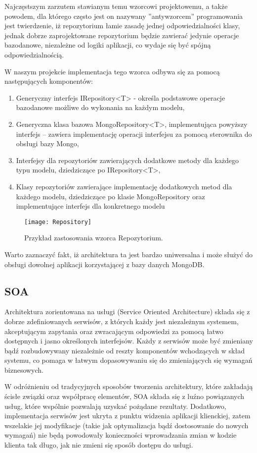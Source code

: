 Najczęstszym zarzutem stawianym temu wzorcowi projektowemu, a także powodem, dla którego często jest on nazywany ”antywzorcem” programowania jest twierdzenie, iż repozytorium łamie zasadę jednej odpowiedzialności klasy, jednak dobrze zaprojektowane repozytorium będzie zawierać jedynie operacje bazodanowe, niezależne od logiki aplikacji, co wydaje się być spójną odpowiedzialnością. 

W naszym projekcie implementacja tego wzorca odbywa się za pomocą następujących komponentów:
\begin{enumerate}
\item Generyczny interfejs IRepository<T> - określa podstawowe operacje bazodanowe możliwe do wykonania na każdym modelu,
\item Generyczna klasa bazowa MongoRepository<T>, implementująca powyższy interfejs – zawiera implementację operacji interfejsu za pomocą sterownika do obsługi bazy Mongo,
\item Interfejsy dla repozytoriów zawierających dodatkowe metody dla każdego typu modelu, dziedziczące po IRepository<T>,
\item	Klasy repozytoriów zawierające implementację dodatkowych metod dla każdego modelu, dziedziczące po klasie MongoRepository oraz implementujące interfejs dla konkretnego modelu
\end{enumerate}

\begin{figure}[htbp]
\centering
\texttt{[image: Repository]}
\caption{Przykład zastosowania wzorca Repozytorium.}
\end{figure}

Warto zaznaczyć fakt, iż architektura ta jest bardzo uniwersalna i może służyć do obsługi dowolnej aplikacji korzystającej z bazy danych MongoDB.

\subsection{SOA}
Architektura zorientowana na usługi (Service Oriented Architecture) składa się z dobrze zdefiniowanych serwisów, z których każdy jest niezależnym systemem, akceptującym zapytania oraz zwracającym odpowiedzi za pomocą łatwo dostępnych i jasno określonych interfejsów. Każdy z serwisów może być zmieniany bądź rozbudowywany niezależnie od reszty komponentów wchodzących w skład systemu, co pomaga w łatwym dopasowywaniu się do zmieniających się wymagań biznesowych.

W odróżnieniu od tradycyjnych sposobów tworzenia architektury, które zakładają ścisłe związki oraz współpracę elementów, SOA składa się z luźno powiązanych usług, które wspólnie pozwalają uzyskać pożądane rezultaty. Dodatkowo, implementacja serwisów jest ukryta z punktu widzenia aplikacji klienckiej, zatem wszelakie jej modyfikacje (takie jak optymalizacja bądź dostosowanie do nowych wymagań) nie będą powodowały konieczności wprowadzania zmian w kodzie klienta tak długo, jak nie zmieni się sposób dostępu do usługi.


